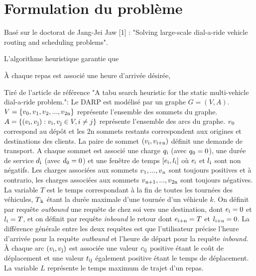 \documentclass[10pt,a4paper]{report}
\begin{document}

\section*{Formulation du problème}
Basé sur le doctorat de Jang-Jei Jaw [1] : "Solving large-scale dial-a-ride vehicle routing and scheduling problems". \newline

L'algorithme heuristique garantie que 

À chaque repas est associé une heure d'arrivée désirée,

Tiré de l'article de référence "A tabu search heuristic for the static multi-vehicle dial-a-ride problem.": \newline
Le DARP est modélisé par un graphe $G=(V,A)$. $V=\{v\textsubscript{0},v\textsubscript{1},v\textsubscript{2},...,v\textsubscript{2n} \}$ représente l'ensemble des sommets du graphe. 
$A=\{(v\textsubscript{i},v\textsubscript{j}):v\textsubscript{i},v\textsubscript{j}\in V,i\neq j\}$ représente l'ensemble des arcs du graphe.  $v\textsubscript{0}$ correspond au dépôt et les 2n sommets restants correspondent aux origines et destinations des clients. La paire de sommet $(v\textsubscript{i},v\textsubscript{i+n})$ définit une demande de transport.  
A chaque sommet est associé une charge $q\textsubscript{i}$ (avec $q\textsubscript{0}=0$), une durée de service $d\textsubscript{i}$ (avec $d\textsubscript{0}=0$)  et une fenêtre de temps $[e\textsubscript{i},l\textsubscript{i}]$ où $e\textsubscript{i}$ et $l\textsubscript{i}$ sont non négatifs.
Les charges associées aux sommets $v\textsubscript{1},...,v\textsubscript{n}$ sont toujours positives et à contrario, les charges associées aux sommets $v\textsubscript{n+1},...,v\textsubscript{2n}$ sont toujours négatives. 
 La variable $T$ est le temps correspondant à la fin de toutes les tournées des véhicules, $T\textsubscript{k}$ étant la durée maximale d'une tournée d'un véhicule $k$. On définit par requête \textit{outbound} une requête de chez soi vers une destination, dont $e\textsubscript{i}=0$ et $l\textsubscript{i}=T$, et on définit par requête \textit{inbound} le retour dont $e\textsubscript{i+n}=T$ et $l\textsubscript{i+n}=0$. La différence générale entre les deux requêtes est que l'utilisateur précise l'heure d'arrivée pour la requête \textit{outbound} et l'heure de départ pour la requête \textit{inbound}.
À chaque arc $(v\textsubscript{i},v\textsubscript{j})$ est associée une valeur $c\textsubscript{ij}$ positive étant le coût de déplacement et une valeur $t\textsubscript{ij}$ également positive étant le temps de déplacement. 
La variable $L$  représente le temps maximum de trajet d'un repas.
    
\end{document}
